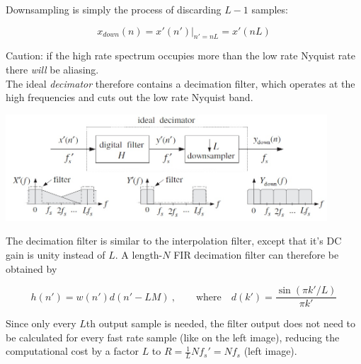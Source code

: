 Downsampling is simply the process of discarding $L-1$ samples:

\begin{equation*}
	x_{down}(n) = \left.x'(n')\right|_{n'=nL} = x'(nL)
\end{equation*}

Caution: if the high rate spectrum occupies more than the low rate Nyquist rate
there \emph{will} be aliasing. \\

The ideal \emph{decimator} therefore contains a decimation filter, which 
operates at the high frequencies and cuts out the low rate Nyquist band.

\begin{center}
	\includegraphics[width=12cm]{images/IntDecOv_Decimator.jpg}
\end{center}

The decimation filter is similar to the interpolation filter, except that
it's DC gain is unity instead of $L$. A length-$N$ FIR decimation filter
can therefore be obtained by

\begin{equation*}
	h(n') = w(n') d(n'-LM) \:,\qquad \text{where} \quad 
	d(k') = \frac{\sin(\pi k'/L)}{\pi k'}
\end{equation*}

Since only every $L$th output sample is needed, the filter output does
not need to be calculated for every fast rate sample (like on the left image),
reducing the computational cost by a factor $L$ to 
$R = \frac{1}{L} N f_s' = N f_s$ (left image). \\

\begin{multicols}{2}
	\begin{center}
		 \\
	\end{center}
\vfill\columnbreak
	\begin{center}
		 \\
	\end{center}
\end{multicols}

